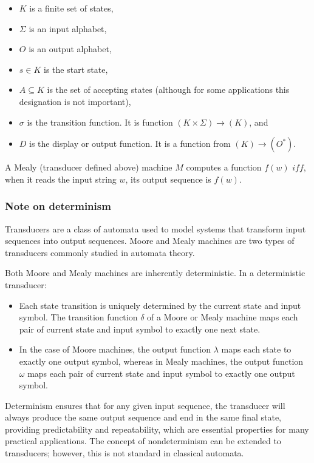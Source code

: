 \documentclass[hidelinks,12pt]{article}
\begin{document}
\begin{itemize}
    \item $K$ is a finite set of states,
    \item $\Sigma$ is an input alphabet,
    \item $O$ is an output alphabet,
    \item $s \in K$ is the start state,
    \item $A \subseteq K $ is the set of accepting states (although for some applications this designation is not important),
    \item $\sigma$ is the transition function. It is function $(K \times \Sigma) \to (K)$, and
    \item $D$ is the display or output function. It is a function from $(K) \to (O^*)$.
\end{itemize}

A Mealy (transducer defined above) machine $M$ computes a function $f(w)$ $
iff$, when it reads the input string $w$, its output sequence is $f(w)$. 

\subsubsection{Note on determinism}

Transducers are a class of automata used to model systems that transform input
sequences into output sequences. Moore and Mealy machines are two types of
transducers commonly studied in automata theory.

Both Moore and Mealy machines are inherently deterministic. In a deterministic
transducer:

\begin{itemize}
  \item Each state transition is uniquely determined by the current state and input symbol. The transition function $\delta$ of a Moore or Mealy machine maps each pair of current state and input symbol to exactly one next state.
  \item In the case of Moore machines, the output function $\lambda$ maps each state to exactly one output symbol, whereas in Mealy machines, the output function $\omega$ maps each pair of current state and input symbol to exactly one output symbol.
\end{itemize}

Determinism ensures that for any given input sequence, the transducer will
always produce the same output sequence and end in the same final state,
providing predictability and repeatability, which are essential properties for
many practical applications.
The concept of nondeterminism can be extended to transducers; however, this is not standard in classical automata.
\end{document}
